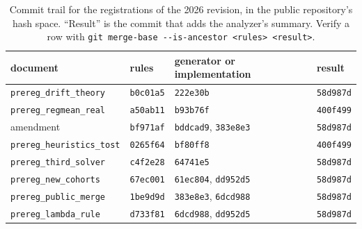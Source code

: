 \begin{table}[htb]
\centering
\small
\caption{Commit trail for the registrations of the 2026 revision, in the
public repository's hash space. ``Result'' is the commit that adds the
analyzer's summary. Verify a row with
\texttt{git merge-base -{}-is-ancestor <rules> <result>}.}
\label{tab:commits-2026}
\begin{tabular}{llll}
\toprule
document & rules & generator or implementation & result \\
\midrule
\texttt{prereg\_drift\_theory} & \texttt{b0c01a5} & \texttt{222e30b} & \texttt{58d987d} \\
\texttt{prereg\_regmean\_real} & \texttt{a50ab11} & \texttt{b93b76f} & \texttt{400f499} \\
\quad amendment & \texttt{bf971af} & \texttt{bddcad9}, \texttt{383e8e3} & \texttt{58d987d} \\
\texttt{prereg\_heuristics\_tost} & \texttt{0265f64} & \texttt{bf80ff8} & \texttt{400f499} \\
\texttt{prereg\_third\_solver} & \texttt{c4f2e28} & \texttt{64741e5} & \texttt{58d987d} \\
\texttt{prereg\_new\_cohorts} & \texttt{67ec001} & \texttt{61ec804}, \texttt{dd952d5} & \texttt{58d987d} \\
\texttt{prereg\_public\_merge} & \texttt{1be9d9d} & \texttt{383e8e3}, \texttt{6dcd988} & \texttt{58d987d} \\
\texttt{prereg\_lambda\_rule} & \texttt{d733f81} & \texttt{6dcd988}, \texttt{dd952d5} & \texttt{58d987d} \\
\bottomrule
\end{tabular}
\end{table}

